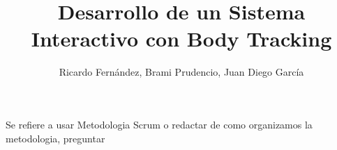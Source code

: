 \documentclass[12pt,letterpaper, openany]{book}
\author{Ricardo Fernández, Brami Prudencio, Juan Diego García}
\title{Desarrollo de un Sistema Interactivo con Body Tracking}
\begin{document}
	
\titleformat{\chapter}[display]{\normalfont\bfseries}{}{0pt}{\Huge}
{\sethead[\thepage][][\chaptertitle]{}{}{\thepage}}
\pagestyle{mystyle}

\@openrighttrue\makeatother
\tableofcontents
\makeatletter\@openrightfalse	
\listoffigures
{}\setcounter{page}{1}







Se refiere a usar Metodologia Scrum o redactar de como organizamos la metodologia, preguntar








\end{document}
